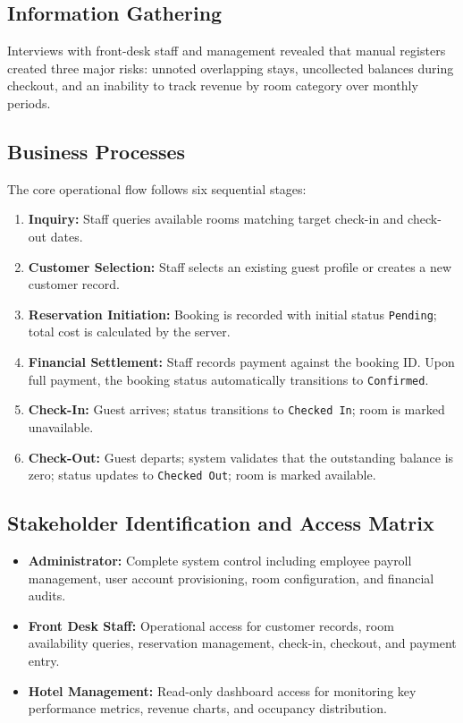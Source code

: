 \documentclass[11pt,a4paper]{article}
\begin{document}
\subsection{Information Gathering}
Interviews with front-desk staff and management revealed that manual registers created three major risks: unnoted overlapping stays, uncollected balances during checkout, and an inability to track revenue by room category over monthly periods.

\subsection{Business Processes}
The core operational flow follows six sequential stages:
\begin{enumerate}[leftmargin=*]
  \item \textbf{Inquiry:} Staff queries available rooms matching target check-in and check-out dates.
  \item \textbf{Customer Selection:} Staff selects an existing guest profile or creates a new customer record.
  \item \textbf{Reservation Initiation:} Booking is recorded with initial status \texttt{Pending}; total cost is calculated by the server.
  \item \textbf{Financial Settlement:} Staff records payment against the booking ID. Upon full payment, the booking status automatically transitions to \texttt{Confirmed}.
  \item \textbf{Check-In:} Guest arrives; status transitions to \texttt{Checked In}; room is marked unavailable.
  \item \textbf{Check-Out:} Guest departs; system validates that the outstanding balance is zero; status updates to \texttt{Checked Out}; room is marked available.
\end{enumerate}

\subsection{Stakeholder Identification and Access Matrix}
\begin{itemize}[leftmargin=*]
  \item \textbf{Administrator:} Complete system control including employee payroll management, user account provisioning, room configuration, and financial audits.
  \item \textbf{Front Desk Staff:} Operational access for customer records, room availability queries, reservation management, check-in, checkout, and payment entry.
  \item \textbf{Hotel Management:} Read-only dashboard access for monitoring key performance metrics, revenue charts, and occupancy distribution.
\end{itemize}
\end{document}
